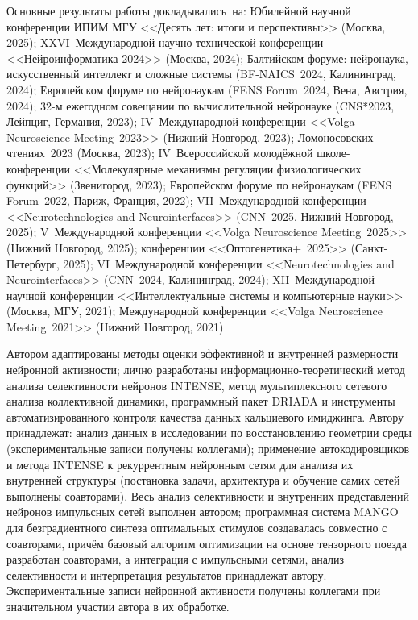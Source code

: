 {\probation}
Основные результаты работы докладывались~на:
Юбилейной научной конференции ИПИМ МГУ <<Десять лет: итоги и перспективы>> (Москва, 2025);
XXVI~Международной научно-технической конференции <<Нейроинформатика-2024>> (Москва, 2024);
Балтийском форуме: нейронаука, искусственный интеллект и сложные системы (BF-NAICS~2024, Калининград, 2024);
Европейском форуме по нейронаукам (FENS Forum~2024, Вена, Австрия, 2024);
32-м ежегодном совещании по вычислительной нейронауке (CNS*2023, Лейпциг, Германия, 2023);
IV~Международной конференции <<Volga Neuroscience Meeting~2023>> (Нижний Новгород, 2023);
Ломоносовских чтениях~2023 (Москва, 2023);
IV~Всероссийской молодёжной школе-конференции <<Молекулярные механизмы регуляции физиологических функций>> (Звенигород, 2023);
Европейском форуме по нейронаукам (FENS Forum~2022, Париж, Франция, 2022);
VII~Международной конференции <<Neurotechnologies and Neurointerfaces>> (CNN~2025, Нижний Новгород, 2025);
V~Международной конференции <<Volga Neuroscience Meeting~2025>> (Нижний Новгород, 2025);
конференции <<Оптогенетика+~2025>> (Санкт-Петербург, 2025);
VI~Международной конференции <<Neurotechnologies and Neurointerfaces>> (CNN~2024, Калининград, 2024);
XII~Международной научной конференции <<Интеллектуальные системы и компьютерные науки>> (Москва, МГУ, 2021);
Международной конференции <<Volga Neuroscience Meeting~2021>> (Нижний Новгород, 2021)

{\contribution} Автором адаптированы методы оценки эффективной
и внутренней размерности нейронной активности; лично разработаны информационно-теоретический
метод анализа селективности нейронов INTENSE, метод мультиплексного сетевого
анализа коллективной динамики, программный пакет DRIADA и инструменты
автоматизированного контроля качества данных кальциевого имиджинга. Автору
принадлежат: анализ данных в исследовании по восстановлению геометрии среды
(экспериментальные записи получены коллегами); применение автокодировщиков
и метода INTENSE к рекуррентным нейронным сетям для анализа их внутренней
структуры (постановка задачи, архитектура и обучение самих сетей выполнены
соавторами). Весь анализ селективности
и внутренних представлений нейронов импульсных сетей выполнен автором;
программная система MANGO для безградиентного синтеза оптимальных стимулов
создавалась совместно с соавторами, причём базовый алгоритм оптимизации
на основе тензорного поезда разработан соавторами, а интеграция с импульсными
сетями, анализ селективности и интерпретация результатов принадлежат автору. Экспериментальные записи нейронной
активности получены коллегами при значительном участии автора в их обработке.

